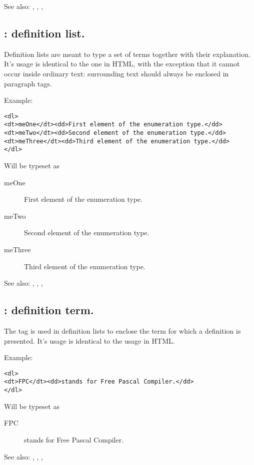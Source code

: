 See also: , , , 

\subsection{ : definition list.}
\label{tag:dl}
Definition lists are meant to type a set of terms together with their
explanation. It's usage is identical to the one in HTML, with the exception
that it cannot occur inside ordinary text: surrounding text should always be
enclosed in paragraph tags.

Example:
\begin{verbatim}
<dl>
<dt>meOne</dt><dd>First element of the enumeration type.</dd>
<dt>meTwo</dt><dd>Second element of the enumeration type.</dd>
<dt>meThree</dt><dd>Third element of the enumeration type.</dd>
</dl>
\end{verbatim}
Will be typeset as
\begin{description}
\item[meOne] First element of the enumeration type.
\item[meTwo] Second element of the enumeration type.
\item[meThree] Third element of the enumeration type.
\end{description}

See also: , , , 

\subsection{ : definition term.}
\label{tag:dt}
The  tag is used in definition lists to enclose the term for which a
definition is presented. It's usage is identical to the usage in HTML.

Example:
\begin{verbatim}
<dl>
<dt>FPC</dt><dd>stands for Free Pascal Compiler.</dd>
</dl>
\end{verbatim}
Will be typeset as
\begin{description}
\item[FPC] stands for Free Pascal Compiler.
\end{description}

See also: , , , 


